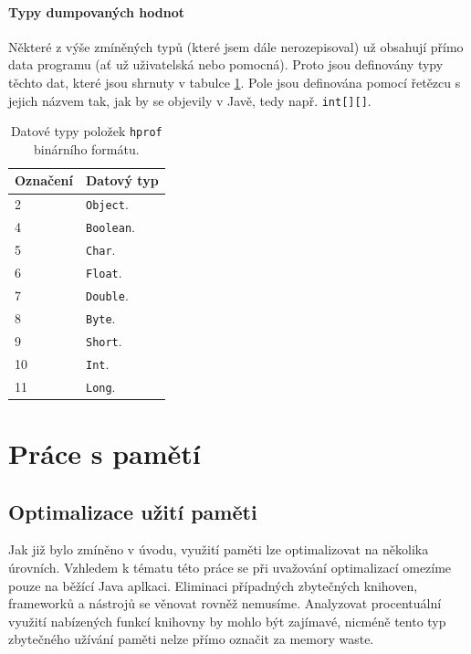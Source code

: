 \subsubsection{Typy dumpovaných hodnot}
Některé z výše zmíněných typů (které jsem dále nerozepisoval) už obsahují přímo data programu (ať už uživatelská nebo pomocná). Proto jsou definovány typy těchto dat, které jsou shrnuty v tabulce \ref{table-hprof-data-types}. Pole jsou definována pomocí řetězcu s jejich názvem tak, jak by se objevily v Javě, tedy např. \texttt{int[][]}.
\begin{table}[ht!]
    \begin{tabularx}{\textwidth}{|l|X|}
        \hline
    \textbf{Označení} & \textbf{Datový typ} \\ \hline \hline
    2 & \texttt{Object}. \\
    4 & \texttt{Boolean}. \\
    5 & \texttt{Char}. \\
    6 & \texttt{Float}. \\
    7 & \texttt{Double}. \\
    8 & \texttt{Byte}. \\
    9 & \texttt{Short}. \\
    10 & \texttt{Int}. \\
    11 & \texttt{Long}. \\ \hline
    \end{tabularx}
    \caption{Datové typy položek \texttt{hprof} binárního formátu.}
    \label{table-hprof-data-types}
\end{table}




\chapter{Práce s pamětí}

\section{Optimalizace užití paměti}

Jak již bylo zmíněno v úvodu, využití paměti lze optimalizovat na několika úrovních. Vzhledem k tématu této práce se při uvažování optimalizací omezíme pouze na běžící Java aplkaci. Eliminaci případných zbytečných knihoven, frameworků a nástrojů se věnovat rovněž nemusíme. Analyzovat procentuální využití nabízených funkcí knihovny by mohlo být zajímavé, nicméně tento typ zbytečného užívání paměti nelze přímo označit za memory waste.

